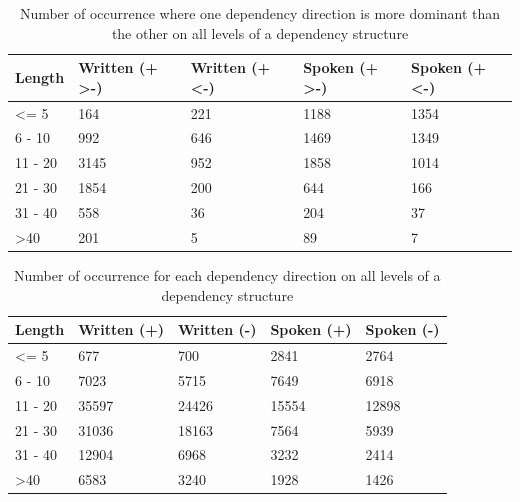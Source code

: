 \documentclass[10pt, a4paper, conference, compsocconf]{IEEEtran}
\begin{document}
\begin{table}
\begin{center}
\caption{Number of occurrence where one dependency direction is more dominant than the other on all levels of a dependency structure}  \label{tab:DLposneg}
\begin{tabular}{p{1.1cm} p{1.2cm} p{1.2cm} p{1.3cm} p{1.3cm}}
\hline
Length & Written (+ \textgreater -) & Written (+ \textless -) & Spoken (+ \textgreater -) & Spoken (+ \textless -) \\ \hline
\textless= 5 & 164 & 221 & 1188 & 1354 \\
6 - 10 & 992 & 646 &1469 & 1349 \\
11 - 20 & 3145 & 952 & 1858 & 1014 \\
21 - 30 & 1854 & 200 & 644 & 166 \\
31 - 40 & 558 & 36 & 204 & 37 \\
\textgreater 40 & 201 & 5 & 89 & 7 \\ \hline
 \end{tabular}
 \end{center}
 \end{table}

\begin{table}
\begin{center}
\caption{Number of occurrence for each dependency direction on all levels of a dependency structure}  \label{tab:tautanposneg}
\begin{tabular}{p{1.1cm} p{1.2cm} p{1.2cm} p{1.3cm} p{1.3cm}}
    \hline
Length & Written (+) & Written (-) & Spoken (+) & Spoken (-) \\ \hline
\textless= 5 & 677 & 700 & 2841 & 2764 \\
6 - 10 & 7023 & 5715 & 7649 & 6918 \\
11 - 20 & 35597 & 24426 & 15554 & 12898 \\
21 - 30 & 31036 & 18163 & 7564 & 5939 \\
31 - 40 & 12904 & 6968 & 3232 & 2414 \\
\textgreater 40 & 6583 & 3240 & 1928 & 1426 \\ \hline
   \end{tabular}
\end{center}
\end{table}
\end{document}
